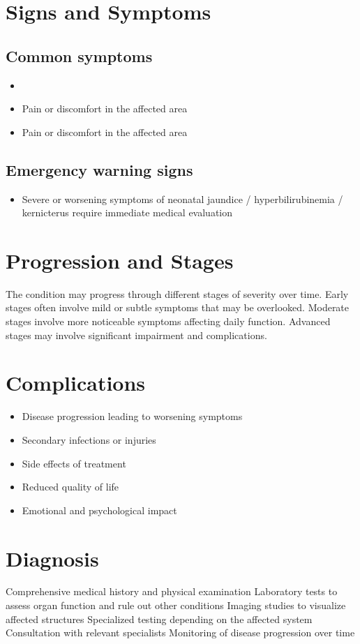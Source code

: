 \section{Signs and Symptoms}

\subsection{Common symptoms}
\begin{itemize}[noitemsep]
  \item \item Pain or discomfort in the affected area    \item Pain or discomfort in the affected area
  \end{itemize}

\subsection{Emergency warning signs}
\begin{itemize}[noitemsep]
  \item Severe or worsening symptoms of neonatal jaundice / hyperbilirubinemia / kernicterus require immediate medical evaluation
\end{itemize}
\section{Progression and Stages}
The condition may progress through different stages of severity over time. Early stages often involve mild or subtle symptoms that may be overlooked. Moderate stages involve more noticeable symptoms affecting daily function. Advanced stages may involve significant impairment and complications.
\section{Complications}
\begin{itemize}[noitemsep]
  \item Disease progression leading to worsening symptoms
  \item Secondary infections or injuries
  \item Side effects of treatment
  \item Reduced quality of life
  \item Emotional and psychological impact
\end{itemize}
\section{Diagnosis}
Comprehensive medical history and physical examination Laboratory tests to assess organ function and rule out other conditions Imaging studies to visualize affected structures Specialized testing depending on the affected system Consultation with relevant specialists Monitoring of disease progression over time

